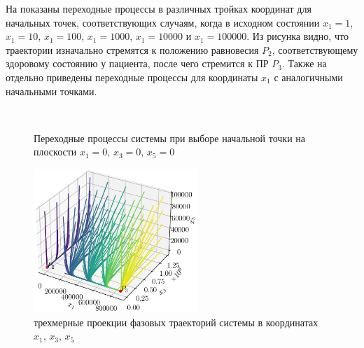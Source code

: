 \documentclass[14pt,a4paper]{extarticle}
\begin{document}
\begin{example}
		На  показаны переходные процессы в различных тройках координат для начальных точек, соответствующих случаям, когда в исходном состоянии $x_1=1$, $x_1=10$, $x_1=100$, $x_1=1000$, $x_1=10000$ и $x_1=100000$. Из рисунка видно, что траектории изначально стремятся к положению равновесия $P_2$, соответствующему здоровому состоянию у пациента, после чего стремится к ПР $P_3$. Также на  отдельно приведены переходные процессы для координаты $x_1$ с аналогичными начальными точками.
		
		\begin{figure}[h]
			\centering
			\\
			\caption{Переходные процессы системы при выборе начальной точки на плоскости $x_1=0,\, x_3=0,\, x_5=0$}
			\label{fig:on_D_border}
		\end{figure}
		\begin{figure}[h]
			\centering
			\includegraphics[width=0.55\textwidth]{media/Figure_12.png}
			\caption{трехмерные проекции фазовых траекторий системы в координатах $x_1,\, x_3,\, x_5$}
			\label{fig:model_K5}
		\end{figure}
		

\end{example}
\end{document}
